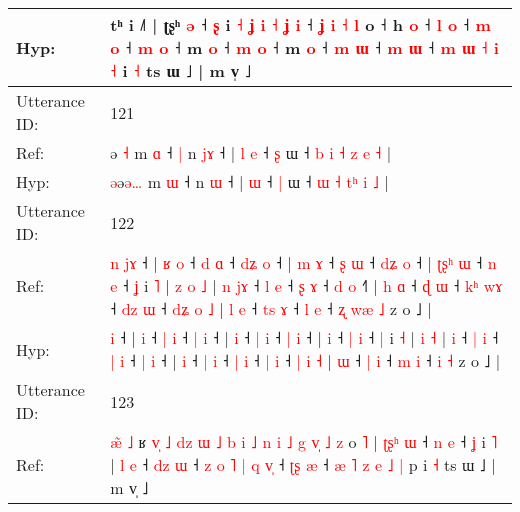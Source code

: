 \documentclass[10pt]{article}
\DeclareRobustCommand{\hl}[1]{{\textcolor{red}{#1}}}
\begin{document}
\begin{longtable}{ll}
 \\
Hyp: & tʰ i ˩˥ | ʈʂʰ \hl{ə} ˧ \hl{ʂ} i\hl{}\hl{} \hl{˧} \hl{}\hl{ʝ} \hl{}\hl{i} \hl{˧} \hl{ʝ} \hl{i} ˧ \hl{ʝ} \hl{i} \hl{˧} \hl{}\hl{l} o\hl{}\hl{}\hl{}\hl{}\hl{}\hl{}\hl{}\hl{}\hl{}\hl{}\hl{}\hl{}\hl{}\hl{}\hl{}\hl{}\hl{}\hl{}\hl{}\hl{}\hl{}\hl{}\hl{} ˧ h \hl{}\hl{o} ˧ \hl{l} \hl{}\hl{o} ˧\hl{}\hl{} \hl{m} \hl{o} ˧\hl{}\hl{}\hl{}\hl{}\hl{}\hl{} \hl{m} \hl{o} ˧ m \hl{o} ˧ \hl{m} \hl{o} ˧\hl{}\hl{} m\hl{}\hl{}\hl{}\hl{}\hl{}\hl{}\hl{}\hl{}\hl{}\hl{}\hl{} \hl{o} ˧ \hl{m} \hl{ɯ} ˧ \hl{m} \hl{ɯ} ˧ \hl{m} \hl{ɯ} \hl{}\hl{˧} \hl{i} \hl{˧} i \hl{˧} ts ɯ ˩ | m v̩ ˩
 \\
\midrule
Utterance ID: & 121 \\
Ref: & \hl{}ə\hl{ }\hl{˧} m \hl{ɑ} ˧\hl{ }\hl{|} n \hl{j}\hl{ɤ} ˧ |\hl{ }\hl{l} \hl{e} ˧ \hl{ʂ} ɯ ˧ \hl{b} \hl{i} \hl{˧}\hl{ }\hl{z} \hl{e} \hl{˧} |
 \\
Hyp: & \hl{ə}ə\hl{ə}\hl{…} m \hl{ɯ} ˧\hl{}\hl{} n \hl{}\hl{ɯ} ˧ |\hl{}\hl{} \hl{ɯ} ˧ \hl{|} ɯ ˧ \hl{ɯ} \hl{˧} \hl{}\hl{t}\hl{ʰ} \hl{i} \hl{˩} |
 \\
\midrule
Utterance ID: & 122 \\
Ref: & \hl{n}\hl{ }\hl{j}\hl{ɤ} ˧ |\hl{ }\hl{ʁ} \hl{o} ˧ \hl{d} \hl{ɑ} ˧ \hl{d}\hl{ʑ} \hl{o} ˧ |\hl{ }\hl{m} \hl{ɤ} ˧ \hl{ʂ} \hl{ɯ} ˧ \hl{d}\hl{ʑ} \hl{o} ˧ |\hl{ }\hl{ʈ}\hl{ʂ}\hl{ʰ} \hl{ɯ} ˧ \hl{n} \hl{e} ˧ \hl{ʝ} i \hl{˥} |\hl{ }\hl{z} \hl{o} \hl{˩} |\hl{ }\hl{n} \hl{j}\hl{ɤ} ˧ \hl{l} \hl{e} ˧ \hl{ʂ} \hl{ɤ} ˧ \hl{d} \hl{o} ˧\hl{˥} |\hl{ }\hl{h} \hl{ɑ} ˧ \hl{ɖ} \hl{ɯ} ˧ \hl{k}\hl{ʰ} \hl{w}\hl{ɤ} ˧ \hl{d}\hl{z} \hl{ɯ} ˧ \hl{d}\hl{ʑ} \hl{o} \hl{˩} |\hl{ }\hl{l} \hl{e} ˧ \hl{t}\hl{s} \hl{ɤ} ˧ \hl{l} \hl{e} ˧\hl{ }\hl{ʐ} \hl{w}\hl{æ} \hl{˩} z o ˩ |
 \\
Hyp: & \hl{}\hl{}\hl{}\hl{i} ˧ |\hl{}\hl{} \hl{i} ˧ \hl{|} \hl{i} ˧ \hl{}\hl{|} \hl{i} ˧ |\hl{}\hl{} \hl{i} ˧ \hl{|} \hl{i} ˧ \hl{}\hl{|} \hl{i} ˧ |\hl{}\hl{}\hl{}\hl{} \hl{i} ˧ \hl{|} \hl{i} ˧ \hl{|} i \hl{˧} |\hl{}\hl{} \hl{i} \hl{˧} |\hl{}\hl{} \hl{}\hl{i} ˧ \hl{|} \hl{i} ˧ \hl{|} \hl{i} ˧ \hl{|} \hl{i} ˧\hl{} |\hl{}\hl{} \hl{i} ˧ \hl{|} \hl{i} ˧ \hl{}\hl{|} \hl{}\hl{i} ˧ \hl{}\hl{|} \hl{i} ˧ \hl{}\hl{|} \hl{i} \hl{˧} |\hl{}\hl{} \hl{ɯ} ˧ \hl{}\hl{|} \hl{i} ˧ \hl{m} \hl{i} ˧\hl{}\hl{} \hl{}\hl{i} \hl{˧} z o ˩ |
 \\
\midrule
Utterance ID: & 123 \\
Ref: & \hl{æ}\hl{̃}\hl{ }\hl{˩}\hl{ }ʁ\hl{ }\hl{v}\hl{̩}\hl{ }\hl{˩}\hl{ }\hl{d}\hl{z}\hl{ }\hl{ɯ}\hl{ }\hl{˩}\hl{ }\hl{b} \hl{i} \hl{˩} \hl{n} \hl{i} \hl{˩} \hl{g} \hl{v}\hl{̩} \hl{˩} \hl{z} o \hl{˥} |\hl{ }\hl{ʈ}\hl{ʂ}\hl{ʰ} \hl{ɯ} ˧ \hl{n} \hl{e} ˧ \hl{ʝ} i \hl{˥} |\hl{ }\hl{l} \hl{e} ˧ \hl{d}\hl{z} \hl{ɯ} ˧\hl{ }\hl{z}\hl{ }\hl{o}\hl{ }\hl{˥}\hl{ }\hl{|} \hl{q} \hl{v}\hl{̩} ˧ \hl{ʈ}\hl{ʂ} \hl{æ} ˧\hl{ }\hl{æ}\hl{ }\hl{˥}\hl{ }\hl{z} \hl{e} \hl{˩} \hl{|} p i \hl{˧} ts ɯ ˩ | m v̩ ˩

\end{longtable}
\end{document}
